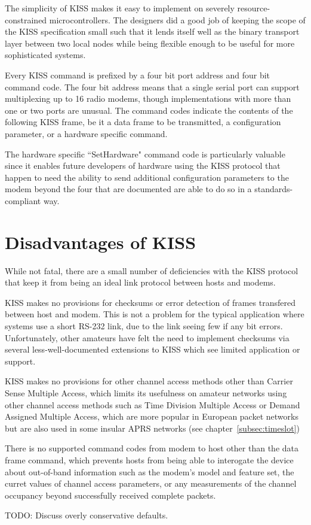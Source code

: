 The simplicity of KISS makes it easy to implement on severely resource-constrained
microcontrollers. The designers did a good job of keeping the scope of the KISS
specification small such that it lends itself well as the binary transport
layer between two local nodes while being flexible enough to be useful for
more sophisticated systems.

Every KISS command is prefixed by a four bit port address and four bit 
command code. The four bit address means that a single serial port can 
support multiplexing up to 16 radio modems, though implementations with more
than one or two ports are unusual. The command codes indicate the contents of the 
following KISS frame, be it a data frame to be transmitted, a configuration
parameter, or a hardware specific command.

The hardware specific ``SetHardware" command code is particularly valuable
since it enables future developers of hardware using the KISS protocol
that happen to need the ability to send additional configuration parameters
to the modem beyond the four that are documented are able to do so in a
standards-compliant way.

\section{Disadvantages of KISS}

While not fatal, there are a small number of deficiencies with the KISS
protocol that keep it from being an ideal link protocol between hosts and modems.

KISS makes no provisions for checksums or error detection of frames transfered
between host and modem. This is not a problem for the typical application where
systems use a short RS-232 link, due to the link seeing few if any bit errors.
Unfortunately, other amateurs have felt the need to implement checksums via
several less-well-documented extensions to KISS which see limited application
or support.

KISS makes no provisions for other channel access methods other than
Carrier Sense Multiple Access, which limits its usefulness on amateur networks
using other channel access methods such as Time Division Multiple Access
or Demand Assigned Multiple Access, which are more popular in European 
packet networks but are also used in some insular APRS networks 
(see chapter~\ref{subsec:timeslot})

There is no supported command codes from modem to host other than the data frame
command, which prevents hosts from being able to interogate the device 
about out-of-band information such as the modem's model and feature set,
the curret values of channel access parameters, or any measurements of the 
channel occupancy beyond successfully received complete packets.

TODO: Discuss overly conservative defaults.

